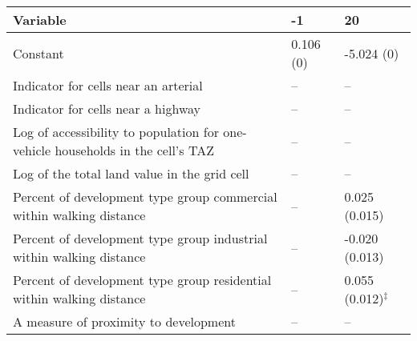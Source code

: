 
\begin{tabular}{p{3in}p{0.5in}p{0.5in}}
\hline\hline
Variable & -1 & 20 \\\hline
Constant & 0.106 (0) & -5.024 (0) \\
Indicator for cells near an arterial & -- & -- \\
Indicator for cells near a highway & -- & -- \\
Log of accessibility to population for one-vehicle households in the cell's TAZ & -- & -- \\
Log of the total land value in the grid cell & -- & -- \\
Percent of development type group commercial within walking distance & -- & 0.025 (0.015) \\
Percent of development type group industrial within walking distance & -- & -0.020 (0.013) \\
Percent of development type group residential within walking distance & -- & 0.055 (0.012)$^{\ddagger}$ \\
A measure of proximity to development & -- & -- \\
\hline\hline
\end{tabular}
